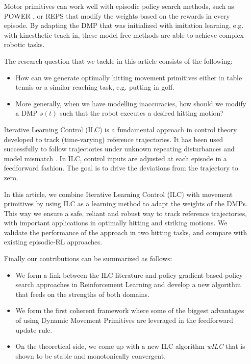 \documentclass[10pt,a4paper]{article}
\newcommand{\dmp}{s} %
\begin{document}
Motor primitives can work well with episodic policy search methods, such as POWER \cite{Kober08}, or REPS \cite{Peter10} that modify the weights based on the rewards in every episode. By adapting the DMP that was initialized with imitation learning, e.g. with kinesthetic teach-in, these model-free methods are able to achieve complex robotic tasks.

The research question that we tackle in this article consists of the following:

\begin{itemize}
\item How can we generate optimally hitting movement primitives either in table tennis or a similar reaching task, e.g. putting in golf.

\item More generally, when we have modelling inaccuracies, how should we modify a DMP $\dmp(t)$ such that the robot executes a desired hitting motion?
\end{itemize}

Iterative Learning Control (ILC) is a fundamental approach in control theory developed to track (time-varying) reference trajectories. It has been used successfully to follow trajectories under unknown repeating disturbances and model mismatch \cite{Bristow06}. In ILC, control inputs are adjusted at each episode in a feedforward fashion. The goal is to drive the deviations from the trajectory to zero. 

In this article, we combine Iterative Learning Control (ILC) with movement primitives by using ILC as a learning method to adapt the weights of the DMPs. This way we ensure a safe, reliant and robust way to track reference trajectories, with important applications in optimally hitting and striking motions. We validate the performance of the approach in two hitting tasks, and compare with existing episodic-RL approaches.

Finally our contributions can be summarized as follows:

\begin{itemize}
\item We form a link between the ILC literature and policy gradient based policy search approaches in Reinforcement Learning and develop a new algorithm that feeds on the strengths of both domains.

\item We form the first coherent framework where some of the biggest advantages of using Dynamic Movement Primitives are leveraged in the feedforward update rule.

\item On the theoretical side, we come up with a new ILC algorithm \emph{wILC} that is shown to be stable and monotonically convergent.

\end{itemize}
\end{document}
